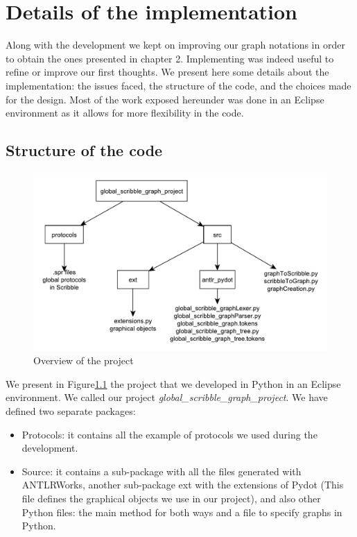 \documentclass[a4paper,11pt,twoside]{report}
\begin{document}
\chapter{Details of the implementation}

Along with the development we kept on improving our graph notations in order to obtain the ones presented in chapter 2. Implementing was indeed useful to refine or improve our first thoughts. We present here some details about the implementation: the issues faced, the structure of the code, and the choices made for the design. Most of the work exposed hereunder was done in an Eclipse environment as it allows for more flexibility in the code. 

\section{Structure of the code}

\begin{figure}[h]
\begin{center}
\includegraphics[scale=0.7]{project_organisation}
\end{center}
\caption{Overview of the project}\label{fig:project}
\end{figure}

We present in Figure\ref{fig:project} the project that we developed in Python in an Eclipse environment. We called our project \emph{global\_scribble\_graph\_project}. We have defined two separate packages:
\begin{itemize}
\item Protocols: it contains all the example of protocols we used during the development.
\item Source: it contains a sub-package with all the files generated with ANTLRWorks, another sub-package ext with the extensions of Pydot (This file defines the graphical objects we use in our project), and also other Python files: the main method for both ways and a file to specify graphs in Python.
\end{itemize}
\end{document}
